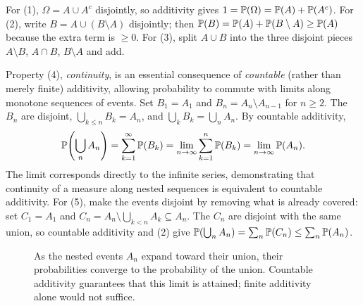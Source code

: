 \begin{whybox}
For (1), $\Omega = A \cup A^c$ disjointly, so additivity gives
$1 = \P(\Omega) = \P(A) + \P(A^c)$.
For (2), write $B = A \cup (B \setminus A)$ disjointly; then
$\P(B) = \P(A) + \P(B\setminus A) \ge \P(A)$ because the extra term is $\ge 0$.
For (3), split $A \cup B$ into the three disjoint pieces
$A\setminus B$, $A\cap B$, $B\setminus A$ and add.

Property (4), \emph{continuity}, is an essential consequence of \emph{countable}
(rather than merely finite) additivity, allowing probability to commute
with limits along monotone sequences of events.
Set $B_1 = A_1$ and $B_n = A_n \setminus A_{n-1}$ for $n \ge 2$. The $B_n$ are
disjoint, $\bigcup_{k\le n} B_k = A_n$, and $\bigcup_k B_k = \bigcup_n A_n$. By
countable additivity,
\[
  \P\!\left(\bigcup_n A_n\right) = \sum_{k=1}^{\infty} \P(B_k)
  = \lim_{n\to\infty} \sum_{k=1}^{n} \P(B_k)
  = \lim_{n\to\infty} \P(A_n).
\]
The limit corresponds directly to the infinite series, demonstrating that
continuity of a measure along nested sequences is equivalent to countable additivity.
For (5), make the events disjoint by removing what is already covered: set
$C_1 = A_1$ and $C_n = A_n \setminus \bigcup_{k<n} A_k \subseteq A_n$. The $C_n$ are
disjoint with the same union, so countable additivity and (2) give
$\P\!\left(\bigcup_n A_n\right) = \sum_n \P(C_n) \le \sum_n \P(A_n)$.
\end{whybox}

\begin{figure}[H]
\centering
{}
\caption{As the nested events $A_n$ expand toward their union, their probabilities
converge to the probability of the union. Countable additivity guarantees that this
limit is attained; finite additivity alone would not suffice.}
\label{ch36:fig-continuity}
\end{figure}

